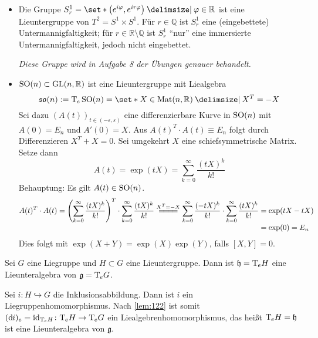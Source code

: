 \begin{beispiel*}[{name=[Lieuntergruppen]}]
	\leavevmode
	\begin{itemize}
		\item Die Gruppe $S^1_r = \set*{\enbrace*{e^{i \varphi}, e^{i r \varphi}} \given \varphi \in \mathbb{R}}$ ist eine Lieuntergruppe von $T^2=S^1 \times S^1$.
		Für $r \in \mathbb{Q}$ ist $S^1_r$ eine (eingebettete) Untermannigfaltigkeit; für $r \in \mathbb{R}\setminus \mathbb{Q}$ ist $S^1_r$ \enquote{nur} eine immersierte Untermannigfaltigkeit, jedoch nicht eingebettet.
		
		\emph{Diese Gruppe wird in Aufgabe 8 der Übungen genauer behandelt.}
		\item $\operatorname{SO}(n) \subset \operatorname{GL}(n,\mathbb{R})$ ist eine Lieuntergruppe mit Liealgebra 
		\[
			\mathfrak{so}(n) := \Tmap_e \SO(n) = \set*{X \in \Mat(n,\mathbb{R}) \given X^T=-X}
		\]
		Sei dazu $(A(t))_{t \in (-\varepsilon,\varepsilon)}$ eine differenzierbare Kurve in $\operatorname{SO}(n)$ mit $A(0)=E_n$ und $A'(0)=X$.
		Aus $A(t)^T \cdot A(t) \equiv E_n$ folgt durch Differenzieren $X^T + X =0$.
		Sei umgekehrt $X$ eine schiefsymmetrische Matrix.
		Setze dann 
		\[
			A(t) =\exp(t X) = \sum_{k=0}^{\infty} \frac{(tX)^k}{k!} 
		\]
		Behauptung: Es gilt $A(t) \in \operatorname{SO}(n)$.
		\begin{align}
			A(t)^T \cdot A(t) = \enbrace*{\sum_{k=0}^{\infty} \frac{(tX)^k}{k!} }^T \cdot \sum_{k=0}^{\infty} \frac{(tX)^k}{k!} \stackrel{X^T=-X}{=\joinrel=\joinrel=\joinrel=}\sum_{k=0}^{\infty} \frac{(-tX)^k}{k!}  \cdot \sum_{k=0}^{\infty} \frac{(tX)^k}{k!} 
			&= \exp(tX-tX) \\[-3pt]
			&= \exp(0) =E_n
		\end{align}
		Dies folgt mit $\exp(X+Y)= \exp(X) \exp(Y)$, falls $[X,Y]=0$.
	\end{itemize}
\end{beispiel*}

\begin{lemma}[{name=[Lieunteralgebra zu einer Lieuntergruppe]}]
	Sei $G$ eine Liegruppe und $H \subset G$ eine Lieuntergruppe.
	Dann ist $\mathfrak{h} = \mathrm{T}\mkern-0.85mu_e H$ eine Lieunteralgebra von $\mathfrak{g} = \mathrm{T}\mkern-0.85mu_e G$.
\end{lemma}
\begin{beweis}
	Sei $i \colon H \hookrightarrow G$ die Inklusionsabbildung.
	Dann ist $i$ ein Liegruppenhomomorphismus.
	Nach \autoref{lem:122} ist somit $(\mathrm{d}\mkern-1.0mu i)_e = \operatorname{id}_{\mathrm{T}\mkern-0.85mu_e H} \colon \mathrm{T}\mkern-0.85mu_e H \to \mathrm{T}\mkern-0.85mu_e G$ ein Liealgebrenhomomorphismus, das heißt $\mathrm{T}\mkern-0.85mu_e H = \mathfrak{h}$ ist eine Lieunteralgebra von $\mathfrak{g}$.
\end{beweis}

